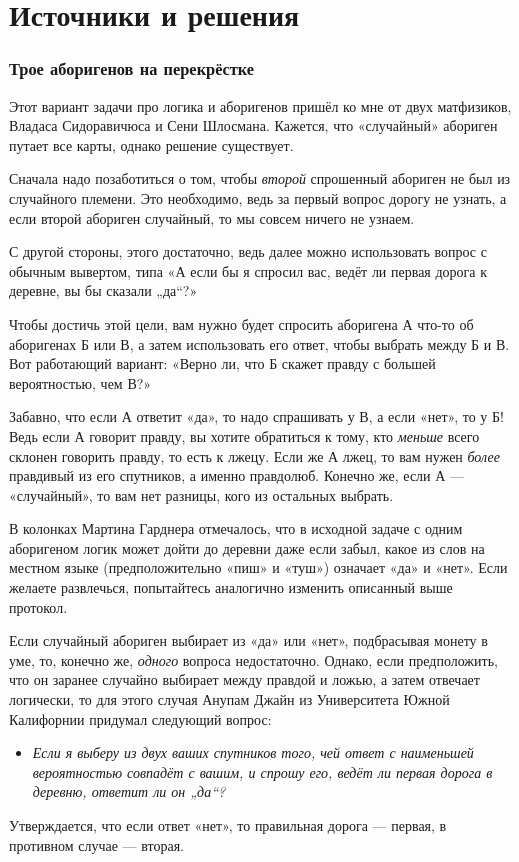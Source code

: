 \section*{Источники и решения}

\subsubsection*{Трое аборигенов на перекрёстке}

Этот вариант задачи про логика и аборигенов пришёл ко мне от двух матфизиков, Владаса Сидоравичюса и Сени Шлосмана.
Кажется, что «случайный» абориген путает все карты, однако решение существует.

Сначала надо позаботиться о том, чтобы \emph{второй} спрошенный абориген не был из случайного племени.
Это необходимо, ведь за первый вопрос дорогу не узнать, а если второй абориген случайный, то мы совсем ничего не узнаем.

С другой стороны, этого достаточно, ведь далее можно использовать вопрос с обычным вывертом, типа «А если бы я спросил вас, ведёт ли первая дорога к деревне, вы бы сказали „да“?»

Чтобы достичь этой цели, вам нужно будет спросить аборигена А что-то об аборигенах Б или В, а затем использовать его ответ, чтобы выбрать между Б и В.
Вот работающий вариант: «Верно ли, что Б скажет правду с большей вероятностью, чем В?»

Забавно, что если А ответит «да», то надо спрашивать у В, а если «нет», то у Б!
Ведь если А говорит правду, вы хотите обратиться к тому, кто \emph{меньше} всего склонен говорить правду, то есть к лжецу.
Если же А лжец, то вам нужен \emph{более} правдивый из его спутников, а именно правдолюб.
Конечно же, если А --- «случайный», то вам нет разницы, кого из остальных выбрать.

В колонках Мартина Гарднера отмечалось, что в исходной задаче с одним аборигеном логик может дойти до деревни даже если забыл, какое из слов на местном языке (предположительно «пиш» и «туш») означает «да» и «нет».
Если желаете развлечься, попытайтесь аналогично изменить описанный выше протокол.

Если случайный абориген выбирает из «да» или «нет», подбрасывая монету в уме, то, конечно же, \emph{одного} вопроса недостаточно.
Однако, если предположить, что он заранее случайно выбирает между правдой и ложью, а затем отвечает логически,
то для этого случая Анупам Джайн из Университета Южной Калифорнии придумал следующий вопрос:
\begin{itemize}
 \item[] \emph{Если я выберу из двух ваших спутников того, чей ответ с наименьшей вероятностью совпадёт с вашим, и спрошу его, ведёт ли первая дорога в деревню, ответит ли он „да“?}
\end{itemize}
Утверждается, что если ответ «нет», то правильная дорога --- первая, в противном случае --- вторая.

